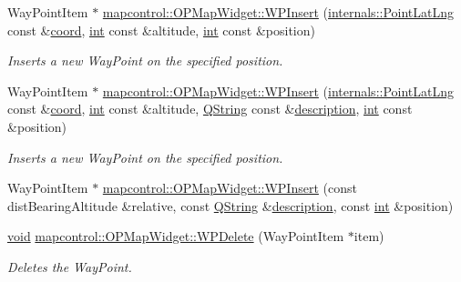 \begin{DoxyCompactItemize}
Way\-Point\-Item $\ast$ \hyperlink{group___o_p_map_widget_ga1b5b37540dd272a7b6f4a39ae12095a4}{mapcontrol\-::\-O\-P\-Map\-Widget\-::\-W\-P\-Insert} (\hyperlink{structinternals_1_1_point_lat_lng}{internals\-::\-Point\-Lat\-Lng} const \&\hyperlink{glext_8h_a4ad6f000813afde2b5727cbfdddc75be}{coord}, \hyperlink{ioapi_8h_a787fa3cf048117ba7123753c1e74fcd6}{int} const \&altitude, \hyperlink{ioapi_8h_a787fa3cf048117ba7123753c1e74fcd6}{int} const \&position)
\begin{DoxyCompactList}\small\item\em Inserts a new Way\-Point on the specified position. \end{DoxyCompactList}\item 
Way\-Point\-Item $\ast$ \hyperlink{group___o_p_map_widget_ga344e39ad3db8c1de32dda8273e78310e}{mapcontrol\-::\-O\-P\-Map\-Widget\-::\-W\-P\-Insert} (\hyperlink{structinternals_1_1_point_lat_lng}{internals\-::\-Point\-Lat\-Lng} const \&\hyperlink{glext_8h_a4ad6f000813afde2b5727cbfdddc75be}{coord}, \hyperlink{ioapi_8h_a787fa3cf048117ba7123753c1e74fcd6}{int} const \&altitude, \hyperlink{group___u_a_v_objects_plugin_gab9d252f49c333c94a72f97ce3105a32d}{Q\-String} const \&\hyperlink{sdlgamepad_8dox_ae82208d022e4246ddf1e4f481a3f81b0}{description}, \hyperlink{ioapi_8h_a787fa3cf048117ba7123753c1e74fcd6}{int} const \&position)
\begin{DoxyCompactList}\small\item\em Inserts a new Way\-Point on the specified position. \end{DoxyCompactList}\item 
Way\-Point\-Item $\ast$ \hyperlink{group___o_p_map_widget_gaf16670bc38e8aca978582a35732e2e6b}{mapcontrol\-::\-O\-P\-Map\-Widget\-::\-W\-P\-Insert} (const dist\-Bearing\-Altitude \&relative, const \hyperlink{group___u_a_v_objects_plugin_gab9d252f49c333c94a72f97ce3105a32d}{Q\-String} \&\hyperlink{sdlgamepad_8dox_ae82208d022e4246ddf1e4f481a3f81b0}{description}, const \hyperlink{ioapi_8h_a787fa3cf048117ba7123753c1e74fcd6}{int} \&position)
\item 
\hyperlink{group___u_a_v_objects_plugin_ga444cf2ff3f0ecbe028adce838d373f5c}{void} \hyperlink{group___o_p_map_widget_gacb242b413e111fc504749bdfacc16fd2}{mapcontrol\-::\-O\-P\-Map\-Widget\-::\-W\-P\-Delete} (Way\-Point\-Item $\ast$item)
\begin{DoxyCompactList}\small\item\em Deletes the Way\-Point. \end{DoxyCompactList}\item 

\end{DoxyCompactItemize}
